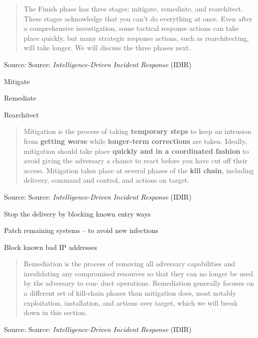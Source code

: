 \documentclass[Screen16to9,17pt]{foils}
\begin{document}


\begin{quote}
The Finish phase has three stages: mitigate, remediate, and rearchitect. These stages acknowledge that you can’t do everything at once. Even after a comprehensive investigation, some tactical response actions can take place quickly, but many strategic response actions, such as rearchitecting, will take longer. We will discuss the three phases next.
\end{quote}
Source: Source: \emph{Intelligence-Driven Incident Response} (IDIR)

\begin{list2}
\item Mitigate
\item Remediate
\item Rearchitect
\end{list2}



\begin{quote}
Mitigation is the process of taking {\bf temporary steps} to keep an intrusion from {\bf getting worse} while {\bf longer-term corrections} are taken. Ideally, mitigation should take place {\bf quickly and in a coordinated fashion} to avoid giving the adversary a chance to react before you have cut off their access. Mitigation takes place at several phases of the {\bf kill chain}, including delivery, command and control, and actions on target.
\end{quote}
Source: Source: \emph{Intelligence-Driven Incident Response} (IDIR)

\begin{list2}
\item Stop the delivery by blocking known entry ways
\item Patch remaining systems -- to avoid new infections
\item Block known bad IP addresses
\end{list2}




\begin{quote}
Remediation is the process of removing all adversary capabilities and invalidating any
compromised resources so that they can no longer be used by the adversary to con‐
duct operations. Remediation generally focuses on a different set of kill-chain phases
than mitigation does, most notably exploitation, installation, and actions over target,
which we will break down in this section.
\end{quote}
Source: Source: \emph{Intelligence-Driven Incident Response} (IDIR)
\end{document}
